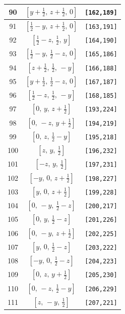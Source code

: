\documentclass[fleqn,8pt]{jsarticle}
\begin{document}
\begin{longtable}{ccc}
90 & $\left[ y + \frac{1}{2},\, z + \frac{1}{2},\, 0 \right]$ & {\tt [162,189]} \\ \hline
91 & $\left[ \frac{1}{2} - y,\, z + \frac{1}{2},\, 0 \right]$ & {\tt [163,191]} \\ \hline
92 & $\left[ \frac{1}{2} - z,\, \frac{1}{2},\, y \right]$ & {\tt [164,190]} \\ \hline
93 & $\left[ \frac{1}{2} - y,\, \frac{1}{2} - z,\, 0 \right]$ & {\tt [165,186]} \\ \hline
94 & $\left[ z + \frac{1}{2},\, \frac{1}{2},\, - y \right]$ & {\tt [166,188]} \\ \hline
95 & $\left[ y + \frac{1}{2},\, \frac{1}{2} - z,\, 0 \right]$ & {\tt [167,187]} \\ \hline
96 & $\left[ \frac{1}{2} - z,\, \frac{1}{2},\, - y \right]$ & {\tt [168,185]} \\ \hline
97 & $\left[ 0,\, y,\, z + \frac{1}{2} \right]$ & {\tt [193,224]} \\ \hline
98 & $\left[ 0,\, - z,\, y + \frac{1}{2} \right]$ & {\tt [194,219]} \\ \hline
99 & $\left[ 0,\, z,\, \frac{1}{2} - y \right]$ & {\tt [195,218]} \\ \hline
100 & $\left[ z,\, y,\, \frac{1}{2} \right]$ & {\tt [196,232]} \\ \hline
101 & $\left[ - z,\, y,\, \frac{1}{2} \right]$ & {\tt [197,231]} \\ \hline
102 & $\left[ - y,\, 0,\, z + \frac{1}{2} \right]$ & {\tt [198,227]} \\ \hline
103 & $\left[ y,\, 0,\, z + \frac{1}{2} \right]$ & {\tt [199,228]} \\ \hline
104 & $\left[ 0,\, - y,\, \frac{1}{2} - z \right]$ & {\tt [200,217]} \\ \hline
105 & $\left[ 0,\, y,\, \frac{1}{2} - z \right]$ & {\tt [201,226]} \\ \hline
106 & $\left[ 0,\, - y,\, z + \frac{1}{2} \right]$ & {\tt [202,225]} \\ \hline
107 & $\left[ y,\, 0,\, \frac{1}{2} - z \right]$ & {\tt [203,222]} \\ \hline
108 & $\left[ - y,\, 0,\, \frac{1}{2} - z \right]$ & {\tt [204,223]} \\ \hline
109 & $\left[ 0,\, z,\, y + \frac{1}{2} \right]$ & {\tt [205,230]} \\ \hline
110 & $\left[ 0,\, - z,\, \frac{1}{2} - y \right]$ & {\tt [206,229]} \\ \hline
111 & $\left[ z,\, - y,\, \frac{1}{2} \right]$ & {\tt [207,221]} \\ \hline

\end{longtable}
\end{document}
